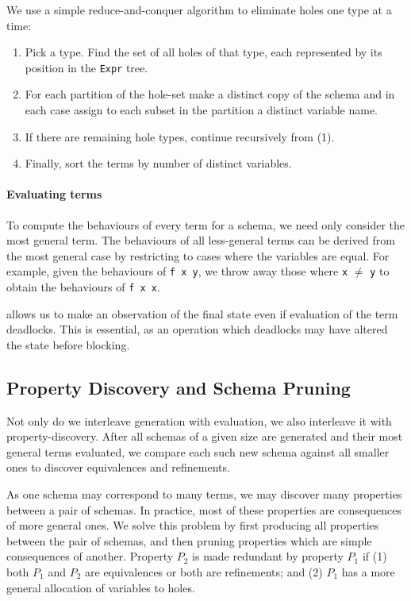 We use a simple reduce-and-conquer algorithm to eliminate holes one
type at a time:

\begin{enumerate}
\item Pick a type.  Find the set of all holes of that type, each
  represented by its position in the \verb|Expr| tree.
\item For each partition of the hole-set make a distinct copy of the
  schema and in each case assign to each subset in the partition a
  distinct variable name.
\item If there are remaining hole types, continue recursively from
  (1).
\item Finally, sort the terms by number of distinct variables.
\end{enumerate}

\paragraph{Evaluating terms}
To compute the behaviours of every term for a schema, we need only
consider the most general term.  The behaviours of all less-general
terms can be derived from the most general case by restricting to
cases where the variables are equal.  For example, given the
behaviours of \verb|f x y|, we throw away those where \verb|x| $\neq$
\verb|y| to obtain the behaviours of \verb|f x x|.

\dejafu{} allows us to make an observation of the final state even if
evaluation of the term deadlocks.  This is essential, as an operation
which deadlocks may have altered the state before blocking.

\subsection{Property Discovery and Schema Pruning}
\label{sec:coco-hiw-prune}

Not only do we interleave generation with evaluation, we also
interleave it with property-discovery.  After all schemas of a given
size are generated and their most general terms evaluated, we compare
each such new schema against all smaller ones to discover equivalences
and refinements.

As one schema may correspond to many terms, we may discover many
properties between a pair of schemas.  In practice, most of these
properties are consequences of more general ones.  We solve this
problem by first producing all properties between the pair of schemas,
and then pruning properties which are simple consequences of another.
Property $P_2$ is made redundant by property $P_1$ if (1) both $P_1$
and $P_2$ are equivalences or both are refinements; and (2) $P_1$ has
a more general allocation of variables to holes.

